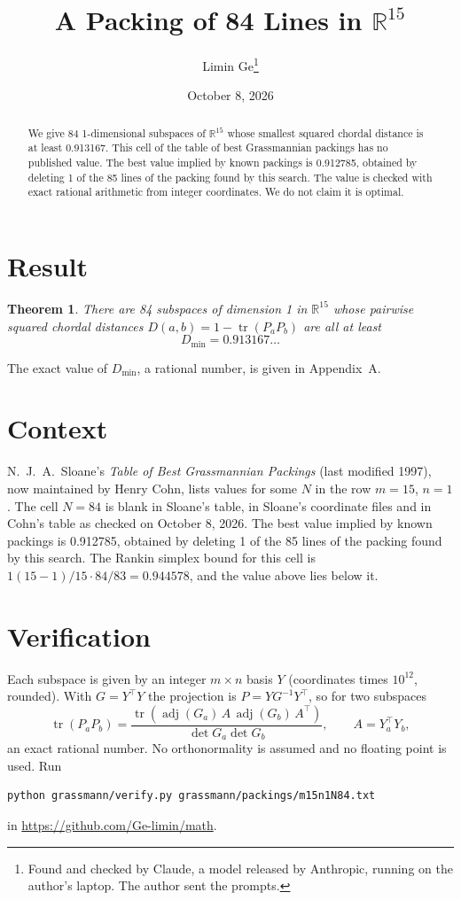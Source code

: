 \documentclass[11pt,a4paper]{article}
\title{A Packing of 84 Lines in $\mathbb{R}^{15}$}
\author{Limin Ge\thanks{Found and checked by Claude, a model released by Anthropic, running on the author's laptop. The author sent the prompts.}}
\date{October 8, 2026}
\newtheorem*{theorem}{Theorem}
\begin{document}
\maketitle
\begin{abstract}
We give 84 1-dimensional subspaces of $\mathbb{R}^{15}$ whose smallest squared chordal distance is at least 0.913167. This cell of the table of best Grassmannian packings has no published value. The best value implied by known packings is 0.912785, obtained by deleting 1 of the 85 lines of the packing found by this search. The value is checked with exact rational arithmetic from integer coordinates. We do not claim it is optimal.
\end{abstract}

\section{Result}
\begin{theorem}
There are 84 subspaces of dimension 1 in $\mathbb{R}^{15}$ whose pairwise squared chordal distances $D(a,b) = 1 - \operatorname{tr}(P_aP_b)$ are all at least
\[ D_{\min} = 0.913167\ldots \]
\end{theorem}
The exact value of $D_{\min}$, a rational number, is given in Appendix~A.


\section{Context}
N.~J.~A.~Sloane's \emph{Table of Best Grassmannian Packings} (last modified 1997), now maintained by Henry Cohn, lists values for some $N$ in the row $m=15$, $n=1$. The cell $N=84$ is blank in Sloane's table, in Sloane's coordinate files and in Cohn's table as checked on October 8, 2026. The best value implied by known packings is 0.912785, obtained by deleting 1 of the 85 lines of the packing found by this search. The Rankin simplex bound for this cell is $1(15-1)/15\cdot 84/83 = 0.944578$, and the value above lies below it.


\section{Verification}
Each subspace is given by an integer $m\times n$ basis $Y$ (coordinates times $10^{12}$, rounded). With $G=Y^\top Y$ the projection is $P=YG^{-1}Y^\top$, so for two subspaces
\[ \operatorname{tr}(P_aP_b)=\frac{\operatorname{tr}(\operatorname{adj}(G_a)\,A\,\operatorname{adj}(G_b)\,A^\top)}{\det G_a\det G_b},\qquad A=Y_a^\top Y_b, \]
an exact rational number. No orthonormality is assumed and no floating point is used. Run
\begin{verbatim}
python grassmann/verify.py grassmann/packings/m15n1N84.txt
\end{verbatim}
in \url{https://github.com/Ge-limin/math}.
\end{document}
